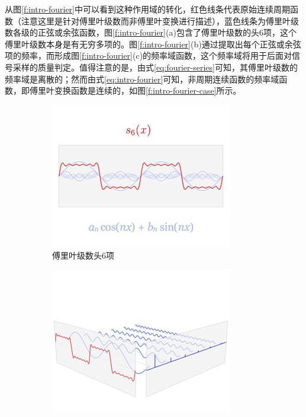 从图\ref{f:intro-fourier}中可以看到这种作用域的转化，红色线条代表原始连续周期函数（注意这里是针对傅里叶级数而非傅里叶变换进行描述），蓝色线条为傅里叶级数各级的正弦或余弦函数，图\ref{f:intro-fourier}(a)包含了傅里叶级数的头6项，这个傅里叶级数本身是有无穷多项的。图\ref{f:intro-fourier}(b)通过提取出每个正弦或余弦项的频率，而形成图\ref{f:intro-fourier}(c)的频率域函数，这个频率域将用于后面对信号采样的质量判定。值得注意的是，由式\ref{eq:fourier-series}可知，其傅里叶级数的频率域是离散的；然而由式\ref{eq:intro-fourier}可知，非周期连续函数的频率域函数，即傅里叶变换函数是连续的，如图\ref{f:intro-fourier-case}所示。

\begin{figure}
\begin{fullwidth}
	\begin{subfigure}[b]{0.33\thewidth}
		\includegraphics[width=1.\textwidth]{figures/intro/fourier-1}
		\caption{傅里叶级数头6项}
	\end{subfigure}
	\begin{subfigure}[b]{0.33\thewidth}
		\includegraphics[width=1.\textwidth]{figures/intro/fourier-2}

\end{subfigure}
\end{fullwidth}
\end{figure}
